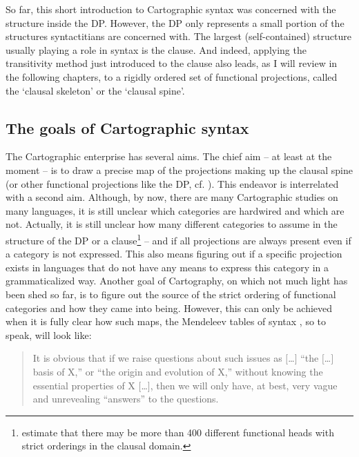 So far, this short introduction to Cartographic syntax was concerned with the structure inside the DP. However, the DP only represents a small portion of the structures syntactitians are concerned with. The largest (self-contained) structure usually playing a role in syntax is the clause. And indeed, applying the transitivity method just introduced to the clause also leads, as I will review in the following chapters, to a rigidly ordered set of functional projections, called the `clausal skeleton' or the `clausal spine'. 

\subsection{The goals of Cartographic syntax}


The Cartographic enterprise has several aims. The chief aim -- at least at the moment -- is to draw a precise map of the projections making up the clausal spine (or other functional projections like the DP, cf. \citealt[3]{cinque2006restructuring}). This endeavor is interrelated with a second aim. Although, by now, there are many Cartographic studies on many languages, it is still unclear which categories are hardwired and which are not. Actually, it is still unclear how many different categories to assume in the structure of the DP or a clause\footnote{ \citep{cinque2010mapping} estimate that there may be more than 400 different functional heads with strict orderings in the clausal domain.} -- and if all projections are always present even if a category is not expressed. This also means figuring out if a specific projection exists in languages that do not have any means to express this category in a grammaticalized way. Another goal of Cartography, on which not much light has been shed so far, is to figure out the source of the strict ordering of functional categories and how they came into being. However, this can only be achieved when it is fully clear how such maps, the Mendeleev tables of syntax \citep[199]{rizzi2013notes}, so to speak, will look like:

\begin{quote}
It is obvious that if we raise questions about such issues as $[$\dots $]$ ``the $[$\dots $]$ basis of X,'' or ``the origin and evolution of X,'' without knowing the essential properties of X $[$\dots $]$, then we will only have, at best, very vague and unrevealing ``answers'' to the questions. \citep[8]{fukui2004tro}
\end{quote}

